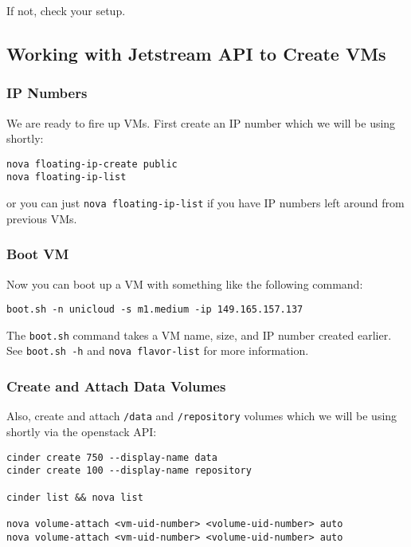 \documentclass[onecolumn,9pt]{article}
\begin{document}
If not, check your setup.

\subsection{Working with Jetstream API to Create VMs}
\label{sec:orgheadline13}

\subsubsection{IP Numbers}
\label{sec:orgheadline9}

We are ready to fire up VMs. First create an IP number which we will be using shortly:

\begin{verbatim}
nova floating-ip-create public
nova floating-ip-list
\end{verbatim}

or you can just \texttt{nova floating-ip-list} if you have IP numbers left around from previous VMs.

\subsubsection{Boot VM}
\label{sec:orgheadline10}

Now you can boot up a VM with something like the following command:

\begin{verbatim}
boot.sh -n unicloud -s m1.medium -ip 149.165.157.137
\end{verbatim}

The \texttt{boot.sh} command takes a VM name, size, and IP number created earlier. See \texttt{boot.sh -h} and \texttt{nova flavor-list} for more information.

\subsubsection{Create and Attach Data Volumes}
\label{sec:orgheadline11}

Also, create and attach \texttt{/data} and \texttt{/repository}  volumes which we will be using shortly via the openstack API:

\begin{verbatim}
cinder create 750 --display-name data
cinder create 100 --display-name repository

cinder list && nova list

nova volume-attach <vm-uid-number> <volume-uid-number> auto
nova volume-attach <vm-uid-number> <volume-uid-number> auto
\end{verbatim}
\end{document}

